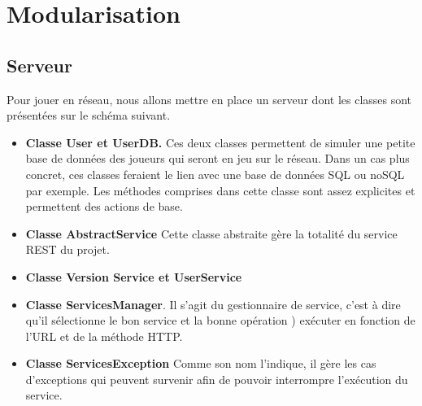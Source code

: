 \section{Modularisation}

\subsection{Serveur}

Pour jouer en réseau, nous allons mettre en place un serveur dont les classes sont présentées sur le schéma suivant. 

\begin{itemize}
    \item \textbf{Classe User et UserDB.}
    Ces deux classes permettent de simuler une petite base de données des joueurs qui seront en jeu sur le réseau. Dans un cas plus concret, ces classes feraient le lien avec une base de données SQL ou noSQL par exemple. Les méthodes comprises dans cette classe sont assez explicites et permettent des actions de base. 
    \newline 
    
    \item \textbf{Classe AbstractService}
    Cette classe abstraite gère la totalité du service REST du projet. 
    
     \item \textbf{Classe Version Service et UserService}
     
     \item \textbf{Classe ServicesManager}. Il s'agit du gestionnaire de service, c'est à dire qu'il sélectionne le bon service et la bonne opération ) exécuter en fonction de l'URL et de la méthode HTTP. 
     
     \item \textbf{Classe ServicesException}
     Comme son nom l'indique, il gère les cas d'exceptions qui peuvent survenir afin de pouvoir interrompre l'exécution du service. 
     
     
\end{itemize} 
